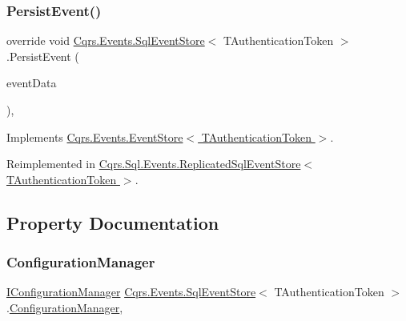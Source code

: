 \mbox{\label{classCqrs_1_1Events_1_1SqlEventStore_a8d67570d50a97050cbce5a29d7a4b9f6_a8d67570d50a97050cbce5a29d7a4b9f6}} 
\subsubsection{\texorpdfstring{Persist\+Event()}{PersistEvent()}}
{\footnotesize\ttfamily override void \hyperlink{classCqrs_1_1Events_1_1SqlEventStore}{Cqrs.\+Events.\+Sql\+Event\+Store}$<$ T\+Authentication\+Token $>$.Persist\+Event (\begin{DoxyParamCaption}\item[{\hyperlink{classCqrs_1_1Events_1_1EventData}{Event\+Data}}]{event\+Data }\end{DoxyParamCaption})\hspace{0.3cm}{\ttfamily [protected]}, {\ttfamily [virtual]}}



Implements \hyperlink{classCqrs_1_1Events_1_1EventStore_aedb71ca0ddf21220e323bc60ad7508cd_aedb71ca0ddf21220e323bc60ad7508cd}{Cqrs.\+Events.\+Event\+Store$<$ T\+Authentication\+Token $>$}.



Reimplemented in \hyperlink{classCqrs_1_1Sql_1_1Events_1_1ReplicatedSqlEventStore_a51c9b1329327e456a251aa2d910fc7ae_a51c9b1329327e456a251aa2d910fc7ae}{Cqrs.\+Sql.\+Events.\+Replicated\+Sql\+Event\+Store$<$ T\+Authentication\+Token $>$}.



\subsection{Property Documentation}
\mbox{\label{classCqrs_1_1Events_1_1SqlEventStore_ac74de2a6905b38d167bcb23055e19b3d_ac74de2a6905b38d167bcb23055e19b3d}} 
\subsubsection{\texorpdfstring{Configuration\+Manager}{ConfigurationManager}}
{\footnotesize\ttfamily \hyperlink{interfaceCqrs_1_1Configuration_1_1IConfigurationManager}{I\+Configuration\+Manager} \hyperlink{classCqrs_1_1Events_1_1SqlEventStore}{Cqrs.\+Events.\+Sql\+Event\+Store}$<$ T\+Authentication\+Token $>$.\hyperlink{classCqrs_1_1Configuration_1_1ConfigurationManager}{Configuration\+Manager}\hspace{0.3cm}{\ttfamily [get]}, {\ttfamily [protected]}}

